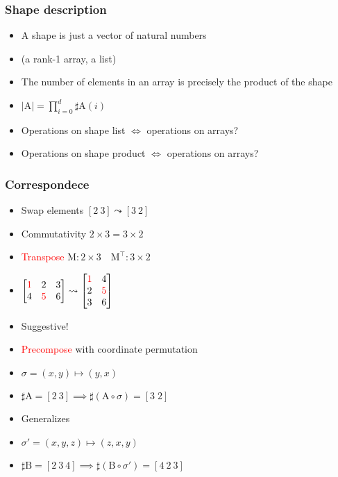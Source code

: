 \documentclass[xetex,mathserif,serif]{beamer}
\let\amsleadsto\leadsto
\let\leadsto\amsleadsto
\newcommand\mrm[1]{\mathrm{#1}}
\newcommand\brm[1]{\bm{\mrm{#1}}}
\newcommand\NB[1]{\textcolor{red}{#1}}
\begin{document}
\begin{frame}
  \frametitle{Shape description}
  \begin{itemize}%
    \item A shape is just a vector of natural numbers
    \item (a rank-1 array, a list)
    \item The number of elements in an array is precisely the
      product of the shape
    \item $|\brm A| = \prod_{i=0}^d \sharp \brm A (i)$
    \item Operations on shape list $\iff$ operations on arrays?
    \item Operations on shape product $\iff$ operations on arrays?
  \end{itemize}
\end{frame}

\begin{frame}
  \frametitle{Correspondece}
  \begin{itemize}%
    \item Swap elements $[2\ 3] \leadsto [3\ 2]$
    \item Commutativity $2\times3 = 3\times2$
    \item \NB{Transpose} $\brm M : 2\times3\quad \brm M^\intercal : 3\times2$
    \item $
      \begin{bmatrix}
        \NB 1 & 2 & 3 \\
        4 & \NB 5 & 6
      \end{bmatrix} \leadsto
      \begin{bmatrix}
        \NB 1 & 4 \\
        2 & \NB 5 \\
        3 & 6
      \end{bmatrix}
    $
    \item Suggestive!
    \item \NB{Precompose} with coordinate permutation
    \item $\sigma = (x, y) \mapsto (y, x)$
    \item $\sharp \brm A = [2\ 3] \implies \sharp(\brm A \circ \sigma) = [3\;2]$ 
    \item Generalizes
    \item $\sigma' = (x, y, z) \mapsto (z, x, y)$
    \item $\sharp \brm B = [2\ 3\ 4] \implies \sharp(\brm B \circ \sigma') = [4\ 2\ 3]$ 
  \end{itemize}
\end{frame}
\end{document}
